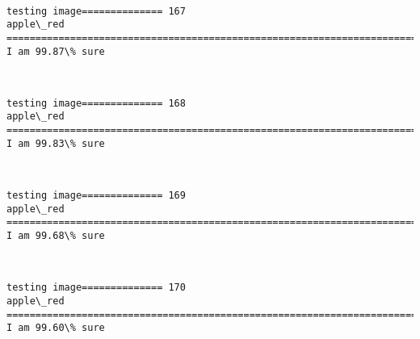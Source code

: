 \documentclass[11pt]{article}
\begin{document}
    \begin{center}
    \end{center}
    { \hspace*{\fill} \\}
    
    \begin{Verbatim}[commandchars=\\\{\}]
testing image============== 167
apple\_red
============================================================================
I am 99.87\% sure

    \end{Verbatim}

    \begin{center}
    \end{center}
    { \hspace*{\fill} \\}
    
    \begin{Verbatim}[commandchars=\\\{\}]
testing image============== 168
apple\_red
============================================================================
I am 99.83\% sure

    \end{Verbatim}

    \begin{center}
    \end{center}
    { \hspace*{\fill} \\}
    
    \begin{Verbatim}[commandchars=\\\{\}]
testing image============== 169
apple\_red
============================================================================
I am 99.68\% sure

    \end{Verbatim}

    \begin{center}
    \end{center}
    { \hspace*{\fill} \\}
    
    \begin{Verbatim}[commandchars=\\\{\}]
testing image============== 170
apple\_red
============================================================================
I am 99.60\% sure

    \end{Verbatim}
\end{document}
